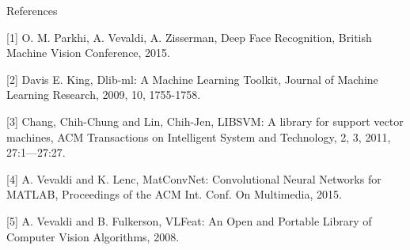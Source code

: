 \documentclass{beamer}
\begin{document}
\begin{tframe}{References}

[1] O. M. Parkhi, A. Vevaldi, A. Zisserman, Deep Face Recognition, British Machine Vision Conference, 2015.

\vspace{0.1in}

[2] Davis E. King, Dlib-ml: A Machine Learning Toolkit, Journal of Machine Learning Research, 2009, 10, 1755-1758.

\vspace{0.1in}

[3] Chang, Chih-Chung and Lin, Chih-Jen, LIBSVM: A library for support vector machines, ACM Transactions on Intelligent System and Technology, 2, 3, 2011, 27:1—27:27.

\vspace{0.1in}

[4] A. Vevaldi and K. Lenc, MatConvNet: Convolutional Neural Networks for MATLAB, Proceedings of the ACM Int. Conf. On Multimedia, 2015.

\vspace{0.1in}

[5] A. Vevaldi and B. Fulkerson, VLFeat: An Open and Portable Library of Computer Vision Algorithms, 2008.


\end{tframe}
\end{document}
